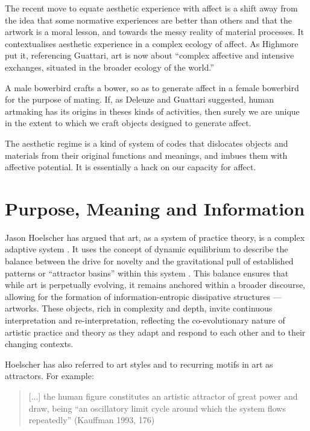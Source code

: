 \documentclass[letterpaper]{article}
\begin{document}
    The recent move to equate aesthetic experience with affect is a shift away from the idea that some normative experiences are better than others and that the artwork is a moral lesson, and towards the messy reality of material processes. It contextualises aesthetic experience in a complex ecology of affect. As Highmore put it, referencing Guattari, art is now about “complex affective and intensive exchanges, situated in the broader ecology of the world.” \citep[p.155]{HighmoreBttrAftrTst2010}

    A male bowerbird crafts a bower, so as to generate affect in a female bowerbird for the purpose of mating. If, as Deleuze and Guattari suggested, human artmaking has its origins in theses kinds of activities, then surely we are unique in the extent to which we craft objects designed to generate affect.
    
    The aesthetic regime is a kind of system of codes that dislocates objects and materials from their original functions and meanings, and imbues them with affective potential. It is essentially a hack on our capacity for affect.

\section{Purpose, Meaning and Information}

    Jason Hoelscher has argued that art, as a system of practice theory, is a complex adaptive system \citep[p.38]{HoelscherNtsOnAtctlytcAsthtcs2015}. It uses the concept of dynamic equilibrium to describe the balance between the drive for novelty and the gravitational pull of established patterns or “attractor basins” within this system \citep[pp.41-42]{HoelscherNtsOnAtctlytcAsthtcs2015}. This balance ensures that while art is perpetually evolving, it remains anchored within a broader discourse, allowing for the formation of information-entropic dissipative structures — artworks. These objects, rich in complexity and depth, invite continuous interpretation and re-interpretation, reflecting the co-evolutionary nature of artistic practice and theory as they adapt and respond to each other and to their changing contexts. 
    
    Hoelscher has also referred to art styles and to recurring motifs in art as attractors. For example:
    
    \begin{quote}
        [...] the human figure constitutes an artistic attractor of great power and draw, being “an oscillatory limit cycle around which the system flows repeatedly” (Kauffman 1993, 176) \citep[pp.11-12]{HoelscherThPtcsOfPhsSpc2014}
    \end{quote}
\end{document}
